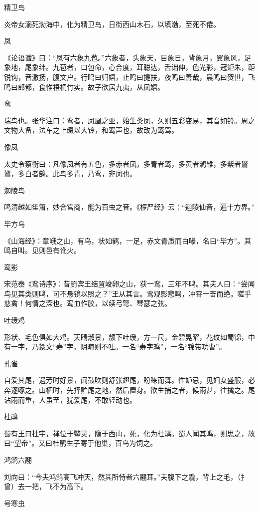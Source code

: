 \documentclass[a4paper,12pt,UTF8,twoside]{ctexbook}
\begin{document}
    精卫鸟
    
    炎帝女溺死渤海中，化为精卫鸟，日衔西山木石，以填渤，至死不倦。
    
    凤
    
    《论语谶》曰：“凤有六象九苞。”六象者，头象天，目象日，背象月，翼象风，足象地，尾象纬。九苞者，口包命，心合度，耳聪达，舌诎伸，色光彩，冠矩朱，距锐钩，音激扬，腹文户。行鸣曰归嬉，止鸣曰提扶，夜鸣曰善哉，晨鸣曰贺世，飞鸣曰郎都，食惟梧桐竹实。故子欲居九夷，从凤嬉。
    
    鸾
    
    瑞鸟也。张华注曰：鸾者，凤凰之亚，始生类凤，久则五彩变易，其音如铃。周之文物大备，法车之上缀以大铃，和鸾声也，故改为鸾驾。
    
    像凤
    
    太史令蔡衡曰：凡像凤者有五色，多赤者凤，多青者鸾，多黄者鹓雏，多紫者鸑鷟，多白者鹄。此鸟多青，乃鸾，非凤也。
    
    迦陵鸟
    
    鸣清越如笙箫，妙合宫商，能为百虫之音。《椤严经》云：“迦陵仙音，遍十方界。”
    
    毕方鸟
    
    《山海经》：章峨之山，有鸟，状如鹤，一足，赤文青质而白喙，名曰“毕方”。其鸣自叫。见则邑有讹火。
    
    鸾影
    
    宋范泰《鸾诗序》：昔罽宾王结罝峻卵之山，获一鸾，三年不鸣。其夫人曰：“尝闻鸟见其类则鸣，可不悬镜以照之？”王从其言。鸾观影悲鸣，冲霄一奋而绝。嗟乎慈禽！何情之深也。鸾血作胶，以续弓弩、琴瑟之弦。
    
    吐绶鸡
    
    形状、毛色俱如大鸡。天睛淑景，颔下吐绶，方一尺，金碧晃曜，花纹如蜀锦，中有一字，乃篆文“寿”字，阴晦则不吐。一名“寿字鸡”，一名“锦带功曹”。
    
    孔雀
    
    自爱其尾，遇芳时好景，闻鼓吹则舒张翅尾，盼睐而舞。性妒忌，见妇女盛服，必奔逐啄之。山栖时，先择贮尾之地，然后置身。欲生捕之者，候雨甚，往擒之。尾沾雨而重，人虽至，犹爱尾，不敢轻动也。
    
    杜鹃
    
    蜀有王曰杜宇，禅位于鳖灵，隐于西山，死，化为杜鹃。蜀人闻其鸣，则思之，故曰“望帝”。又曰杜鹃生子寄于他巢，百鸟为饲之。
    
    鸿鹄六翮
    
    刘向曰：“今夫鸿鹄高飞冲天，然其所恃者六翮耳。”夫腹下之毳，背上之毛，（扌曾）去一把，飞不为高下。
    
    号寒虫
    
\end{document}
